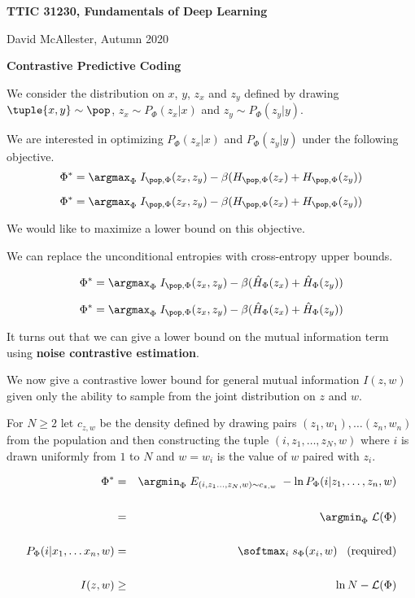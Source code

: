 





{\Huge
  \centerline{\bf TTIC 31230,  Fundamentals of Deep Learning}
  \vfill
  \centerline{David McAllester, Autumn   2020}
  \vfill
  \centerline{\bf Contrastive Predictive Coding}
  \vfill
  \vfill



We consider the distribution on $x$, $y$, $z_x$ and $z_y$ defined by drawing $\tuple{x,y} \sim \pop$, $z_x \sim P_\Phi(z_x|x)$ and $z_y \sim P_\Phi(z_y|y)$.

\vfill
We are interested in optimizing $P_\Phi(z_x|x)$ and $P_\Phi(z_y|y)$ under the following objective.
\vfill
$$\Phi^* = \argmax_{\Phi} \; I_{\pop,\Phi}(z_x,z_y) - \beta (H_{\pop,\Phi}(z_x) + H_{\pop,\Phi}(z_y))$$


$$\Phi^* = \argmax_{\Phi} \; I_{\pop,\Phi}(z_x,z_y) - \beta (H_{\pop,\Phi}(z_x) + H_{\pop,\Phi}(z_y))$$

\vfill
We would like to maximize a lower bound on this objective.

\vfill
We can replace the unconditional entropies with cross-entropy upper bounds.

\vfill
$$\Phi^* = \argmax_{\Phi} \; I_{\pop,\Phi}(z_x,z_y) - \beta (\hat{H}_\Phi(z_x) + \hat{H}_\Phi(z_y))$$



$$\Phi^* = \argmax_{\Phi} \; I_{\pop,\Phi}(z_x,z_y) - \beta (\hat{H}_\Phi(z_x) + \hat{H}_\Phi(z_y))$$

\vfill
It turns out that we can give a lower bound on the mutual information term using {\bf noise contrastive estimation}.


We now give a contrastive lower bound for general mutual information $I(z,w)$ given only the ability to sample from the joint distribution on $z$ and $w$.

\vfill
For $N \geq 2$ let {\color{red} $c_{z,w}$} be the density defined by drawing pairs $(z_1,w_1), \ldots (z_n,w_n)$ from the population
and then constructing the tuple $(i,z_1,\ldots,z_N,w)$ where $i$ is drawn uniformly from $1$ to $N$ and $w = w_i$ is the value of $w$ paired with $z_i$.


{\huge
\begin{eqnarray*}
\Phi^* & = & \argmin_\Phi \;E_{(i,z_1\ldots,z_N,w) \sim c_{z,w}}\;-\ln P_\Phi(i|z_1,\ldots,z_n,w) \\
\\
& = & \argmin_\Phi\;{\cal L}(\Phi) \\
\\
P_\Phi(i|x_1,\ldots x_n,w) & = & \softmax_i\;s_\Phi(x_i,w) \;\;\;\mbox{(required)} \\
\\
I(z,w) & \geq & \ln N - {\cal L}(\Phi)
\end{eqnarray*}
}

}
